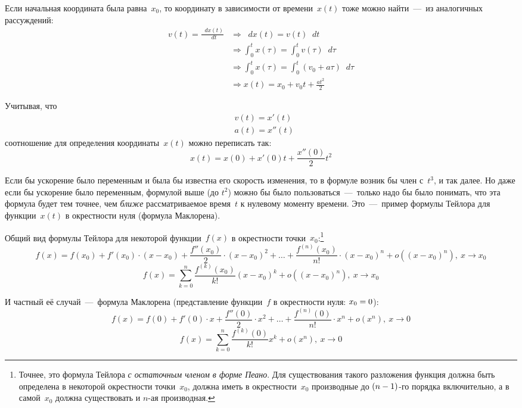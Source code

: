 \documentclass[a4paper,12pt]{article}
\newcommand{\diff}{\mathop{}\!d}
\begin{document}
  Если начальная координата была равна~$x_0$, то координату в зависимости от времени~$x(t)$ тоже можно найти~---~из аналогичных рассуждений:
  \begin{equation*}
  \begin{split}
    v(t) = \frac{\diff x(t)}{\diff t} &\Rightarrow \diff x(t) = v(t) \diff t\\
    &\Rightarrow \int_0^t x(\tau) = \int_0^t v(\tau) \diff \tau\\
    &\Rightarrow \int_0^t x(\tau) = \int_0^t (v_0 + a \tau) \diff \tau\\
    &\Rightarrow x(t) = x_0 + v_0 t + \frac{at^2}{2}
  \end{split}
  \end{equation*}

  Учитывая, что
  \[
    \begin{aligned}
      &v(t) = x'(t)\\
      &a(t) = x''(t)
    \end{aligned}
  \]
  соотношение для определения координаты~$x(t)$ можно переписать так:
  \[
    x(t) = x(0) + x'(0) t + \frac{x''(0)}{2}t^2
  \]

  Если бы ускорение было переменным и была бы известна его скорость изменения, то в формуле возник бы член с~$t^3$, и так далее.
  Но даже если бы ускорение было переменным, формулой выше (до $t^2$) можно бы было пользоваться~---~только надо бы было понимать, что эта формула будет тем точнее, чем \emph{ближе} рассматриваемое время~$t$ к нулевому моменту времени.
  Это~---~пример формулы Тейлора для функции~$x(t)$ в окрестности нуля (формула Маклорена).

  Общий вид формулы Тейлора для некоторой функции~$f(x)$ в окрестности точки~$x_0$:\footnote{
    Точнее, это формула Тейлора \emph{с остаточным членом в форме Пеано}.
    Для существования такого разложения функция должна быть определена в некоторой окрестности точки~$x_0$, должна иметь в окрестности~$x_0$ производные до $(n \hm- 1)$-го порядка включительно, а в самой~$x_0$ должна существовать и $n$-ая производная.
  }
  \[
    f(x) = f(x_0) + f'(x_0) \cdot (x - x_0) + \frac{f''(x_0)}{2} \cdot (x - x_0)^2 + \ldots + \frac{f^{(n)}(x_0)}{n!} \cdot (x - x_0)^n + o((x - x_0)^n),\ x \to x_0
  \]
  \begin{equation}
    f(x) = \sum_{k = 0}^n \frac{f^{(k)}(x_0)}{k!} (x - x_0)^k + o((x - x_0)^n),\ x \to x_0
  \end{equation}

  И частный её случай~---~формула Маклорена (представление функции~$f$ в окрестности нуля: $x_0 \hm= 0$):
  \[
    f(x) = f(0) + f'(0) \cdot x + \frac{f''(0)}{2} \cdot x^2 + \ldots + \frac{f^{(n)}(0)}{n!} \cdot x^n + o(x^n),\ x \to 0
  \]
  \begin{equation}\label{eq:maclore}
    f(x) = \sum_{k = 0}^n \frac{f^{(k)}(0)}{k!} x^k + o(x^n),\ x \to 0
  \end{equation}
\end{document}

